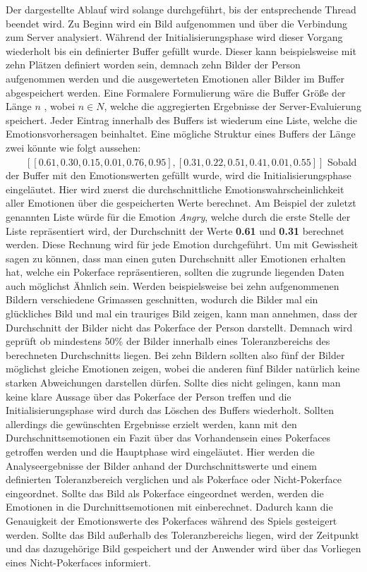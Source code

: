 \documentclass[12pt, a4paper]{scrbook}
\begin{document}
Der dargestellte Ablauf wird solange durchgeführt, bis der entsprechende Thread beendet wird. Zu Beginn wird ein Bild aufgenommen und über die Verbindung zum Server analysiert. Während der Initialisierungsphase wird dieser Vorgang wiederholt bis ein definierter Buffer gefüllt wurde. Dieser kann beispielsweise mit zehn Plätzen definiert worden sein, demnach zehn Bilder der Person aufgenommen werden und die ausgewerteten Emotionen aller Bilder im Buffer abgespeichert werden. Eine Formalere Formulierung wäre die Buffer Größe der Länge $ n $  , wobei $ n \in N $, welche die aggregierten Ergebnisse der Server-Evaluierung speichert. Jeder Eintrag innerhalb des Buffers ist wiederum eine Liste, welche die Emotionsvorhersagen beinhaltet. Eine mögliche Struktur eines Buffers der Länge zwei könnte wie folgt aussehen: $ \qquad[ [0.61, 0.30, 0.15, 0.01, 0.76, 0.95] , [0.31, 0.22, 0.51, 0.41, 0.01, 0.55] ] $
Sobald der Buffer mit den Emotionswerten gefüllt wurde, wird die Initialisierungsphase eingeläutet. Hier wird zuerst die durchschnittliche Emotionswahrscheinlichkeit aller Emotionen über die gespeicherten Werte berechnet. Am Beispiel der zuletzt genannten Liste würde für die Emotion \textit{Angry}, welche durch die erste Stelle der Liste repräsentiert wird, der Durchschnitt der Werte \textbf{0.61} und \textbf{0.31} berechnet werden. Diese Rechnung wird für jede Emotion durchgeführt. 
\newline
Um mit Gewissheit sagen zu können, dass man einen guten Durchschnitt aller Emotionen erhalten hat, welche ein Pokerface repräsentieren, sollten die zugrunde liegenden Daten auch möglichst Ähnlich sein. Werden beispielsweise bei zehn aufgenommenen Bildern verschiedene Grimassen geschnitten, wodurch die Bilder mal ein glückliches Bild und mal ein trauriges Bild zeigen, kann man annehmen, dass der Durchschnitt der Bilder nicht das Pokerface der Person darstellt. Demnach wird geprüft ob mindestens 50\% der Bilder innerhalb eines Toleranzbereichs des berechneten Durchschnitts liegen. Bei zehn Bildern sollten also fünf der Bilder möglichst gleiche Emotionen zeigen, wobei die anderen fünf Bilder natürlich keine starken Abweichungen darstellen dürfen.
Sollte dies nicht gelingen, kann man keine klare Aussage über das Pokerface der Person treffen und die Initialisierungsphase wird durch das Löschen des Buffers wiederholt.
Sollten allerdings die gewünschten Ergebnisse erzielt werden, kann mit den Durchschnittsemotionen ein Fazit über das Vorhandensein eines Pokerfaces getroffen werden und die Hauptphase wird eingeläutet. Hier werden die Analyseergebnisse der Bilder anhand der Durchschnittswerte und einem definierten Toleranzbereich verglichen und als Pokerface oder Nicht-Pokerface eingeordnet. Sollte das Bild als Pokerface eingeordnet werden, werden die Emotionen in die Durchnittsemotionen mit einberechnet. Dadurch kann die Genauigkeit der Emotionswerte des Pokerfaces während des Spiels gesteigert werden. Sollte das Bild außerhalb des Toleranzbereichs liegen, wird der Zeitpunkt und das dazugehörige Bild gespeichert und der Anwender wird über das Vorliegen eines Nicht-Pokerfaces informiert.
\end{document}

